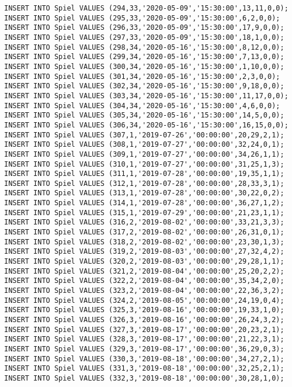 \documentclass{lehramt-informatik-aufgabe}
\begin{document}
\begin{verbatim}
INSERT INTO Spiel VALUES (294,33,'2020-05-09','15:30:00',13,11,0,0);
INSERT INTO Spiel VALUES (295,33,'2020-05-09','15:30:00',6,2,0,0);
INSERT INTO Spiel VALUES (296,33,'2020-05-09','15:30:00',17,9,0,0);
INSERT INTO Spiel VALUES (297,33,'2020-05-09','15:30:00',18,1,0,0);
INSERT INTO Spiel VALUES (298,34,'2020-05-16','15:30:00',8,12,0,0);
INSERT INTO Spiel VALUES (299,34,'2020-05-16','15:30:00',7,13,0,0);
INSERT INTO Spiel VALUES (300,34,'2020-05-16','15:30:00',1,10,0,0);
INSERT INTO Spiel VALUES (301,34,'2020-05-16','15:30:00',2,3,0,0);
INSERT INTO Spiel VALUES (302,34,'2020-05-16','15:30:00',9,18,0,0);
INSERT INTO Spiel VALUES (303,34,'2020-05-16','15:30:00',11,17,0,0);
INSERT INTO Spiel VALUES (304,34,'2020-05-16','15:30:00',4,6,0,0);
INSERT INTO Spiel VALUES (305,34,'2020-05-16','15:30:00',14,5,0,0);
INSERT INTO Spiel VALUES (306,34,'2020-05-16','15:30:00',16,15,0,0);
INSERT INTO Spiel VALUES (307,1,'2019-07-26','00:00:00',20,29,2,1);
INSERT INTO Spiel VALUES (308,1,'2019-07-27','00:00:00',32,24,0,1);
INSERT INTO Spiel VALUES (309,1,'2019-07-27','00:00:00',34,26,1,1);
INSERT INTO Spiel VALUES (310,1,'2019-07-27','00:00:00',31,25,1,3);
INSERT INTO Spiel VALUES (311,1,'2019-07-28','00:00:00',19,35,1,1);
INSERT INTO Spiel VALUES (312,1,'2019-07-28','00:00:00',28,33,3,1);
INSERT INTO Spiel VALUES (313,1,'2019-07-28','00:00:00',30,22,0,2);
INSERT INTO Spiel VALUES (314,1,'2019-07-28','00:00:00',36,27,1,2);
INSERT INTO Spiel VALUES (315,1,'2019-07-29','00:00:00',21,23,1,1);
INSERT INTO Spiel VALUES (316,2,'2019-08-02','00:00:00',33,21,3,3);
INSERT INTO Spiel VALUES (317,2,'2019-08-02','00:00:00',26,31,0,1);
INSERT INTO Spiel VALUES (318,2,'2019-08-02','00:00:00',23,30,1,3);
INSERT INTO Spiel VALUES (319,2,'2019-08-03','00:00:00',27,32,4,2);
INSERT INTO Spiel VALUES (320,2,'2019-08-03','00:00:00',29,28,1,1);
INSERT INTO Spiel VALUES (321,2,'2019-08-04','00:00:00',25,20,2,2);
INSERT INTO Spiel VALUES (322,2,'2019-08-04','00:00:00',35,34,2,0);
INSERT INTO Spiel VALUES (323,2,'2019-08-04','00:00:00',22,36,3,2);
INSERT INTO Spiel VALUES (324,2,'2019-08-05','00:00:00',24,19,0,4);
INSERT INTO Spiel VALUES (325,3,'2019-08-16','00:00:00',19,33,1,0);
INSERT INTO Spiel VALUES (326,3,'2019-08-16','00:00:00',26,24,3,2);
INSERT INTO Spiel VALUES (327,3,'2019-08-17','00:00:00',20,23,2,1);
INSERT INTO Spiel VALUES (328,3,'2019-08-17','00:00:00',21,22,3,1);
INSERT INTO Spiel VALUES (329,3,'2019-08-17','00:00:00',36,29,0,3);
INSERT INTO Spiel VALUES (330,3,'2019-08-18','00:00:00',34,27,2,1);
INSERT INTO Spiel VALUES (331,3,'2019-08-18','00:00:00',32,25,2,1);
INSERT INTO Spiel VALUES (332,3,'2019-08-18','00:00:00',30,28,1,0);

\end{verbatim}
\end{document}
